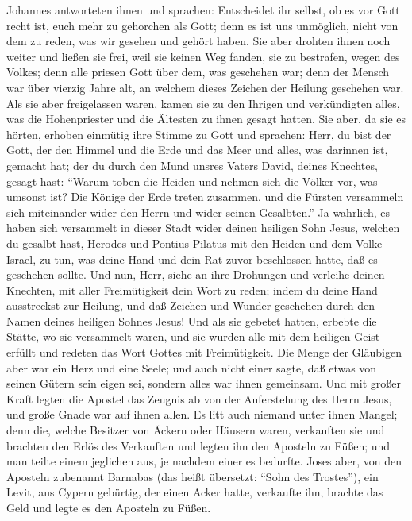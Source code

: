 Johannes antworteten ihnen und sprachen: Entscheidet ihr selbst, ob es
vor Gott recht ist, euch mehr zu gehorchen als Gott; 
denn es ist uns unmöglich, nicht von dem zu reden, was wir gesehen und
gehört haben.  Sie aber drohten ihnen noch weiter und
ließen sie frei, weil sie keinen Weg fanden, sie zu bestrafen, wegen des
Volkes; denn alle priesen Gott über dem, was geschehen war;
 denn der Mensch war über vierzig Jahre alt, an welchem
dieses Zeichen der Heilung geschehen war.  Als sie aber
freigelassen waren, kamen sie zu den Ihrigen und verkündigten alles, was
die Hohenpriester und die Ältesten zu ihnen gesagt hatten.
 Sie aber, da sie es hörten, erhoben einmütig ihre Stimme
zu Gott und sprachen: Herr, du bist der Gott, der den Himmel und die
Erde und das Meer und alles, was darinnen ist, gemacht hat;
 der du durch den Mund unsres Vaters David, deines
Knechtes, gesagt hast: ``Warum toben die Heiden und nehmen sich die
Völker vor, was umsonst ist?  Die Könige der Erde treten
zusammen, und die Fürsten versammeln sich miteinander wider den Herrn
und wider seinen Gesalbten.''  Ja wahrlich, es haben sich
versammelt in dieser Stadt wider deinen heiligen Sohn Jesus, welchen du
gesalbt hast, Herodes und Pontius Pilatus mit den Heiden und dem Volke
Israel,  zu tun, was deine Hand und dein Rat zuvor
beschlossen hatte, daß es geschehen sollte.  Und nun,
Herr, siehe an ihre Drohungen und verleihe deinen Knechten, mit aller
Freimütigkeit dein Wort zu reden;  indem du deine Hand
ausstreckst zur Heilung, und daß Zeichen und Wunder geschehen durch den
Namen deines heiligen Sohnes Jesus!  Und als sie gebetet
hatten, erbebte die Stätte, wo sie versammelt waren, und sie wurden alle
mit dem heiligen Geist erfüllt und redeten das Wort Gottes mit
Freimütigkeit.  Die Menge der Gläubigen aber war ein Herz
und eine Seele; und auch nicht einer sagte, daß etwas von seinen Gütern
sein eigen sei, sondern alles war ihnen gemeinsam.  Und
mit großer Kraft legten die Apostel das Zeugnis ab von der Auferstehung
des Herrn Jesus, und große Gnade war auf ihnen allen.  Es
litt auch niemand unter ihnen Mangel; denn die, welche Besitzer von
Äckern oder Häusern waren, verkauften sie und brachten den Erlös des
Verkauften  und legten ihn den Aposteln zu Füßen; und man
teilte einem jeglichen aus, je nachdem einer es bedurfte.
 Joses aber, von den Aposteln zubenannt Barnabas (das
heißt übersetzt: ``Sohn des Trostes''), ein Levit, aus Cypern gebürtig,
 der einen Acker hatte, verkaufte ihn, brachte das Geld
und legte es den Aposteln zu Füßen.

